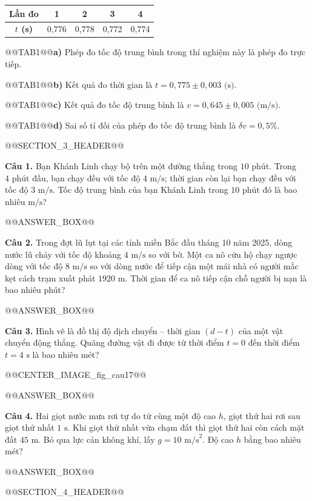 \documentclass{article}
\begin{document}
\begin{tabular}{|c|c|c|c|c|}\hline \textbf{Lần đo} & \textbf{1} & \textbf{2} & \textbf{3} & \textbf{4} \\ \hline \textbf{$t$ (s)} & 0,776 & 0,778 & 0,772 & 0,774 \\ \hline\end{tabular}

@@TAB1@@\textbf{a)} Phép đo tốc độ trung bình trong thí nghiệm này là phép đo trực tiếp.

@@TAB1@@\textbf{b)} Kết quả đo thời gian là $t = 0{,}775 \pm 0{,}003\text{ (s)}$.

@@TAB1@@\textbf{c)} Kết quả đo tốc độ trung bình là $v = 0{,}645 \pm 0{,}005\text{ (m/s)}$.

@@TAB1@@\textbf{d)} Sai số tỉ đối của phép đo tốc độ trung bình là $\delta v = 0{,}5\%$.

@@SECTION_3_HEADER@@

\textbf{Câu 1.} Bạn Khánh Linh chạy bộ trên một đường thẳng trong $10\text{ phút}$. Trong $4\text{ phút}$ đầu, bạn chạy đều với tốc độ $4\text{ m/s}$; thời gian còn lại bạn chạy đều với tốc độ $3\text{ m/s}$. Tốc độ trung bình của bạn Khánh Linh trong $10\text{ phút}$ đó là bao nhiêu $\text{m/s}$?

@@ANSWER_BOX@@

\textbf{Câu 2.} Trong đợt lũ lụt tại các tỉnh miền Bắc đầu tháng 10 năm 2025, dòng nước lũ chảy với tốc độ khoảng $4\text{ m/s}$ so với bờ. Một ca nô cứu hộ chạy ngược dòng với tốc độ $8\text{ m/s}$ so với dòng nước để tiếp cận một mái nhà có người mắc kẹt cách trạm xuất phát $1920\text{ m}$. Thời gian để ca nô tiếp cận chỗ người bị nạn là bao nhiêu phút?

@@ANSWER_BOX@@

\textbf{Câu 3.} Hình vẽ là đồ thị độ dịch chuyển -- thời gian $(d - t)$ của một vật chuyển động thẳng. Quãng đường vật đi được từ thời điểm $t = 0$ đến thời điểm $t = 4\text{ s}$ là bao nhiêu mét?

@@CENTER_IMAGE_fig_cau17@@

@@ANSWER_BOX@@

\textbf{Câu 4.} Hai giọt nước mưa rơi tự do từ cùng một độ cao $h$, giọt thứ hai rơi sau giọt thứ nhất $1\text{ s}$. Khi giọt thứ nhất vừa chạm đất thì giọt thứ hai còn cách mặt đất $45\text{ m}$. Bỏ qua lực cản không khí, lấy $g = 10\text{ m/s}^2$. Độ cao $h$ bằng bao nhiêu mét?

@@ANSWER_BOX@@

@@SECTION_4_HEADER@@
\end{document}
